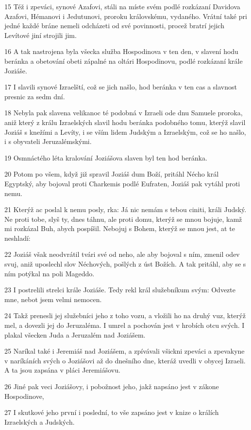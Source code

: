 \par 15 Též i zpeváci, synové Azafovi, stáli na míste svém podlé rozkázaní Davidova Azafovi, Hémanovi i Jedutunovi, proroku královskému, vydaného. Vrátní také pri jedné každé bráne nemeli odcházeti od své povinnosti, procež bratrí jejich Levítové jiní strojili jim.
\par 16 A tak nastrojena byla všecka služba Hospodinova v ten den, v slavení hodu beránka a obetování obeti zápalné na oltári Hospodinovu, podlé rozkázaní krále Joziáše.
\par 17 I slavili synové Izraelští, což se jich našlo, hod beránka v ten cas a slavnost presnic za sedm dní.
\par 18 Nebyla pak slavena velikanoc té podobná v Izraeli ode dnu Samuele proroka, aniž který z králu Izraelských slavil hodu beránka podobného tomu, kterýž slavil Joziáš s knežími a Levíty, i se vším lidem Judským a Izraelským, což se ho našlo, i s obyvateli Jeruzalémskými.
\par 19 Osmnáctého léta kralování Joziášova slaven byl ten hod beránka.
\par 20 Potom po všem, když již spravil Joziáš dum Boží, pritáhl Nécho král Egyptský, aby bojoval proti Charkemis podlé Eufraten, Joziáš pak vytáhl proti nemu.
\par 21 Kterýž ac poslal k nemu posly, rka: Já nic nemám s tebou ciniti, králi Judský. Ne proti tobe, slyš ty, dnes táhnu, ale proti domu, kterýž se mnou bojuje, kamž mi rozkázal Buh, abych pospíšil. Nebojuj s Bohem, kterýž se mnou jest, at te neshladí:
\par 22 Joziáš však neodvrátil tvári své od neho, ale aby bojoval s ním, zmenil odev svuj, aniž uposlechl slov Néchových, pošlých z úst Božích. A tak pritáhl, aby se s ním potýkal na poli Mageddo.
\par 23 I postrelili strelci krále Joziáše. Tedy rekl král služebníkum svým: Odvezte mne, nebot jsem velmi nemocen.
\par 24 Takž prenesli jej služebníci jeho z toho vozu, a vložili ho na druhý vuz, kterýž mel, a dovezli jej do Jeruzaléma. I umrel a pochován jest v hrobích otcu svých. I plakal všecken Juda a Jeruzalém nad Joziášem.
\par 25 Naríkal také i Jeremiáš nad Joziášem, a zpívávali všickni zpeváci a zpevakyne v naríkáních svých o Joziášovi až do dnešního dne, kteráž uvedli v obycej Izraeli. A ta jsou zapsána v pláci Jeremiášovu.
\par 26 Jiné pak veci Joziášovy, i pobožnost jeho, jakž napsáno jest v zákone Hospodinove,
\par 27 I skutkové jeho první i poslední, to vše zapsáno jest v knize o králích Izraelských a Judských.

